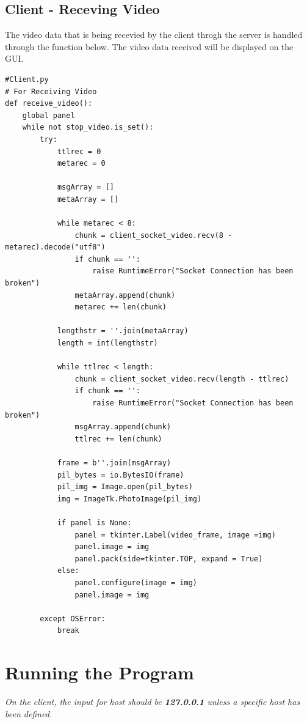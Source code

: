 \documentclass[a4paper,11pt]{article}
\begin{document}
\subsection{Client - Receving Video}
The video data that is being recevied by the client throgh the server is handled through the function below. The video data received will be displayed on the GUI.
\begin{mdframed}[backgroundcolor=light-gray, roundcorner=30pt,leftmargin=1, rightmargin=1, innerleftmargin=5, innertopmargin=-3,innerbottommargin=5, outerlinewidth=1, linecolor=light-gray]
\begin{lstlisting}
#Client.py
# For Receiving Video
def receive_video():
	global panel
	while not stop_video.is_set():
		try:
			ttlrec = 0
			metarec = 0

			msgArray = []
			metaArray = []

			while metarec < 8:
				chunk = client_socket_video.recv(8 - metarec).decode("utf8")
				if chunk == '':
					raise RuntimeError("Socket Connection has been broken")
				metaArray.append(chunk)
				metarec += len(chunk)

			lengthstr = ''.join(metaArray)
			length = int(lengthstr)

			while ttlrec < length:
				chunk = client_socket_video.recv(length - ttlrec)
				if chunk == '':
					raise RuntimeError("Socket Connection has been broken")
				msgArray.append(chunk)
				ttlrec += len(chunk)

			frame = b''.join(msgArray)
			pil_bytes = io.BytesIO(frame)
			pil_img = Image.open(pil_bytes)
			img = ImageTk.PhotoImage(pil_img)

			if panel is None:
				panel = tkinter.Label(video_frame, image =img)
				panel.image = img
				panel.pack(side=tkinter.TOP, expand = True)
			else:
				panel.configure(image = img)
				panel.image = img

		except OSError:
			break

\end{lstlisting}
\end{mdframed}

\section{Running the Program}
\textit{On the client, the input for host should be \textbf{127.0.0.1} unless a specific host has been defined.}
\end{document}
